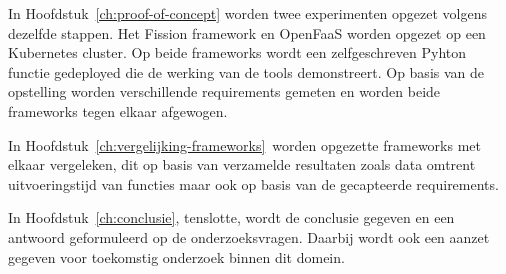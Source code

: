 In Hoofdstuk~\ref{ch:proof-of-concept} worden twee experimenten opgezet volgens dezelfde stappen. Het Fission framework en OpenFaaS worden opgezet op een Kubernetes cluster. Op beide frameworks wordt een zelfgeschreven Pyhton functie gedeployed die de werking van de tools demonstreert. Op basis van de opstelling worden verschillende requirements gemeten en worden beide frameworks tegen elkaar afgewogen.

In Hoofdstuk~\ref{ch:vergelijking-frameworks} worden opgezette frameworks met elkaar vergeleken, dit op basis van verzamelde resultaten zoals data omtrent uitvoeringstijd van functies maar ook op basis van de gecapteerde requirements.

In Hoofdstuk~\ref{ch:conclusie}, tenslotte, wordt de conclusie gegeven en een antwoord geformuleerd op de onderzoeksvragen. Daarbij wordt ook een aanzet gegeven voor toekomstig onderzoek binnen dit domein.

